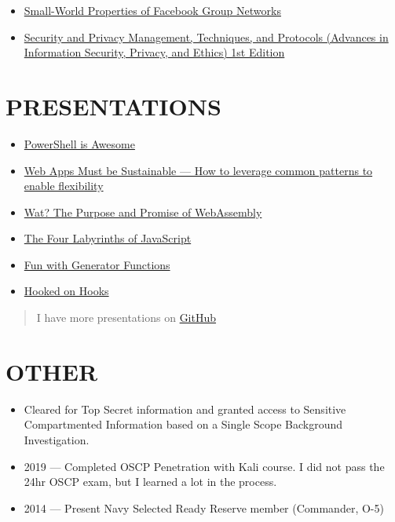 \documentclass[10pt]{article}
\def\tightlist{}
\begin{document}
\begin{itemize}
\tightlist
\item
  \href{http://wpmedia.wolfram.com/uploads/sites/13/2018/02/23-3-1.pdf}{Small-World
  Properties of Facebook Group Networks}
\item
  \href{https://smile.amazon.com/gp/product/1522555838/ref=ppx_yo_dt_b_asin_title_o02_s00?ie=UTF8\&psc=1}{Security
  and Privacy Management, Techniques, and Protocols (Advances in
  Information Security, Privacy, and Ethics) 1st Edition}
\end{itemize}

\hypertarget{presentations}{%
\section{PRESENTATIONS}\label{presentations}}

\begin{itemize}
\tightlist
\item
  \href{https://powershell.surge.sh/}{PowerShell is Awesome}
\item
  \href{http://sustainable.surge.sh/}{Web Apps Must be Sustainable ---
  How to leverage common patterns to enable flexibility}
\item
  \href{http://wat-brown-bag.surge.sh/}{Wat? The Purpose and Promise of
  WebAssembly}
\item
  \href{http://www.jasonwohlgemuth.com/slides-javascript-labyrinths/\#/title}{The
  Four Labyrinths of JavaScript}
\item
  \href{https://generators.surge.sh/}{Fun with Generator Functions}
\item
  \href{http://hooked-on-hooks.surge.sh/}{Hooked on Hooks}
\end{itemize}

\begin{quote}
I have more presentations on \href{https://github.com/?q=slides}{GitHub}
\end{quote}

\hypertarget{other}{%
\section{OTHER}\label{other}}

\begin{itemize}
\tightlist
\item
  Cleared for Top Secret information and granted access to Sensitive
  Compartmented Information based on a Single Scope Background
  Investigation.
\item
  2019 --- Completed OSCP Penetration with Kali course. I did not pass
  the 24hr OSCP exam, but I learned a lot in the process.
\item
  2014 --- Present Navy Selected Ready Reserve member (Commander, O-5)
\end{itemize}
\end{document}
